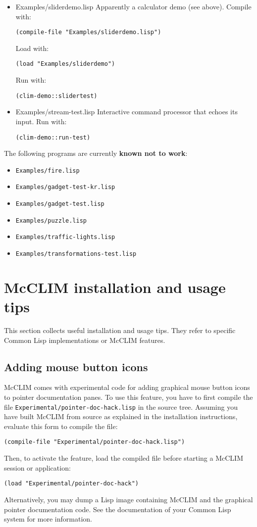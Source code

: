 \begin{itemize}
\item Examples/sliderdemo.lisp
Apparently a calculator demo (see above).  Compile with:
\begin{verbatim}
(compile-file "Examples/sliderdemo.lisp")
\end{verbatim}
Load with:
\begin{verbatim}
(load "Examples/sliderdemo")
\end{verbatim}
Run with:
\begin{verbatim}
(clim-demo::slidertest)
\end{verbatim}
\item Examples/stream-test.lisp
Interactive command processor that echoes its input.  Run with:
\begin{verbatim}
(clim-demo::run-test)
\end{verbatim}
\end{itemize}

The following programs are currently \textbf{known not to work}:
\begin{itemize}
\item
 \texttt{Examples/fire.lisp}
\item
 \texttt{Examples/gadget-test-kr.lisp}
\item
 \texttt{Examples/gadget-test.lisp}
\item
 \texttt{Examples/puzzle.lisp}
\item
 \texttt{Examples/traffic-lights.lisp}
\item
 \texttt{Examples/transformations-test.lisp}
\end{itemize}

\section{McCLIM installation and usage tips}

This section collects useful installation and usage tips.  They refer to
specific Common Lisp implementations or McCLIM features.

\subsection{Adding mouse button icons}

McCLIM comes with experimental code for adding graphical mouse button
icons to pointer documentation panes.  To use this feature, you have to
first compile the file \texttt{Experimental/pointer-doc-hack.lisp} in the
source tree.  Assuming you have built McCLIM from source as explained in
the installation instructions, evaluate this form to compile the file:
\begin{verbatim}
(compile-file "Experimental/pointer-doc-hack.lisp")
\end{verbatim}
Then, to activate the feature, load the compiled file before starting a
McCLIM session or application:
\begin{verbatim}
(load "Experimental/pointer-doc-hack")
\end{verbatim}
Alternatively, you may dump a Lisp image containing McCLIM and the
graphical pointer documentation code.  See the documentation of your
Common Lisp system for more information.
